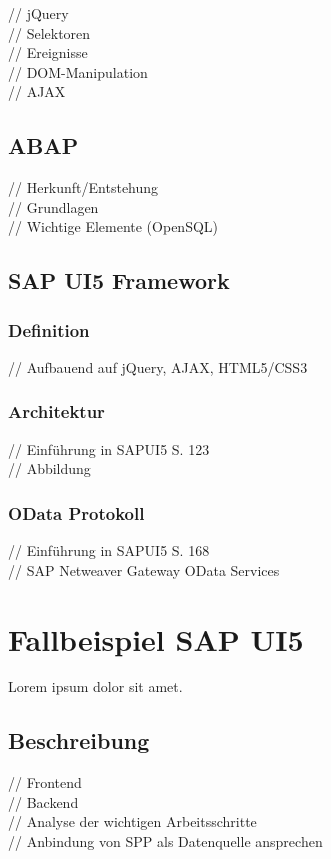\documentclass[12pt,a4paper,bibliography=totocnumbered,listof=totocnumbered]{scrartcl}
\begin{document}
// jQuery\\
// Selektoren\\
// Ereignisse\\
// DOM-Manipulation\\
// AJAX\\

\subsection{ABAP}
// Herkunft/Entstehung\\
// Grundlagen\\
// Wichtige Elemente (OpenSQL)\\

\subsection{SAP UI5 Framework}
\subsubsection{Definition}
// Aufbauend auf jQuery, AJAX, HTML5/CSS3 \cite{AntoEinf2014}\\

\subsubsection{Architektur}
// Einführung in SAPUI5 S. 123 \cite{AntoEinf2014}\\
// Abbildung\\

\subsubsection{OData Protokoll}
// Einführung in SAPUI5 S. 168 \\
// SAP Netweaver Gateway OData Services\\

\pagebreak
\section{Fallbeispiel SAP UI5}
Lorem ipsum dolor sit amet.

\subsection{Beschreibung}
// Frontend\\
// Backend\\
// Analyse der wichtigen Arbeitsschritte\\
// Anbindung von \ac{SPP} als Datenquelle ansprechen\\
\end{document}

